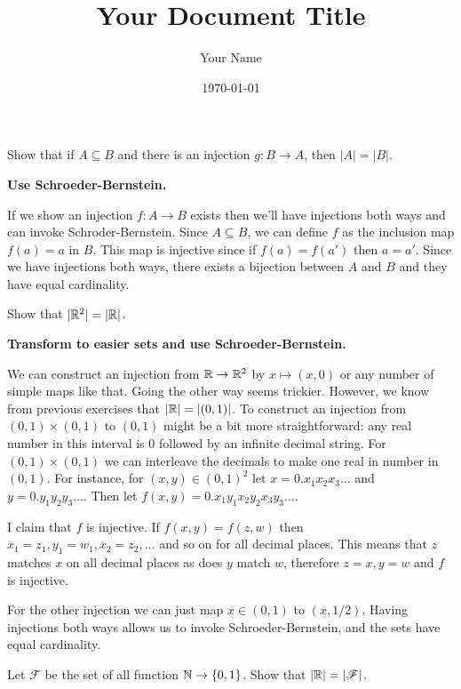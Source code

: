 \documentclass{article}
\title{Your Document Title}
\author{Your Name}
\date{\today} %
\begin{document}
\maketitle

\begin{problem}
Show that if $A \subseteq B$ and there is an injection $g: B \to A$, then $|A| = |B|$.
\end{problem}

\textbf{Use Schroeder-Bernstein.}

If we show an injection $f: A \to B$ exists then we'll have injections both ways and can invoke Schroder-Bernstein. Since $A \subseteq B$, we can define $f$ as the inclusion map $f(a) = a$ in $B$. This map is injective since if $f(a) = f(a')$ then $a = a'$. Since we have injections both ways, there exists a bijection between $A$ and $B$ and they have equal cardinality.

\begin{problem}
Show that $|\mathbb{R}^2| = |\mathbb{R}|$.
\end{problem}

\textbf{Transform to easier sets and use Schroeder-Bernstein.}

We can construct an injection from $\mathbb{R} \to \mathbb{R}^2$ by $x \mapsto (x, 0)$ or any number of simple maps like that. Going the other way seems trickier. However, we know from previous exercises that $|\mathbb{R}| = |(0, 1)|$. To construct an injection from $(0, 1) \times (0, 1)$ to $(0, 1)$ might be a bit more straightforward: any real number in this interval is 0 followed by an infinite decimal string. For $(0, 1) \times (0, 1)$ we can interleave the decimals to make one real in number in $(0, 1)$. For instance, for $(x, y) \in (0, 1)^2$ let $x = 0.x_1 x_2 x_3 \ldots$ and $y = 0.y_1 y_2 y_3 \ldots$. Then let $f(x, y) = 0.x_1 y_1 x_2 y_2 x_3 y_3 \ldots$.

I claim that $f$ is injective. If $f(x, y) = f(z, w)$ then $x_1 = z_1, y_1 = w_1, x_2 = z_2, \ldots$ and so on for all decimal places. This means that $z$ matches $x$ on all decimal places as does $y$ match $w$, therefore $z = x, y = w$ and $f$ is injective.

For the other injection we can just map $x \in (0, 1)$ to $(x, 1/2)$. Having injections both ways allows us to invoke Schroeder-Bernstein, and the sets have equal cardinality.

\begin{problem}
Let $\mathscr{F}$ be the set of all function $\mathbb{N} \to \{0, 1\}$. Show that $|\mathbb{R}| = |\mathscr{F}|$.
\end{problem}
\end{document}
